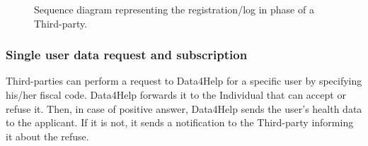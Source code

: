             \begin{figure}[H]
                \centering
                \caption{Sequence diagram representing the registration/log in phase of a Third-party.}
                \label{fig:seq-diagram2}
            \end{figure}
            
            
        \subsubsection{Single user data request and subscription}
  
            Third-parties can perform a request to Data4Help for a specific user by specifying his/her fiscal code. Data4Help forwards it to the Individual that can accept or refuse it. Then, in case of positive answer, Data4Help sends the user's health data to the applicant. If it is not, it sends a notification to the Third-party informing it about the refuse.

